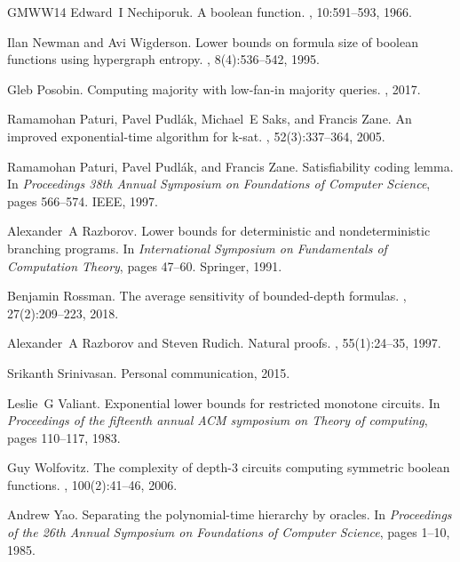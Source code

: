 \documentclass[10pt,a4paper]{article}
\theoremstyle{definition}
\theoremstyle{remark}
\begin{document}
\begin{thebibliography}{GMWW14}
Edward~I Nechiporuk.
\newblock A boolean function.
, 10:591--593, 1966.

Ilan Newman and Avi Wigderson.
\newblock Lower bounds on formula size of boolean functions using hypergraph
  entropy.
, 8(4):536--542, 1995.

Gleb Posobin.
\newblock Computing majority with low-fan-in majority queries.
, 2017.

Ramamohan Paturi, Pavel Pudl{\'a}k, Michael~E Saks, and Francis Zane.
\newblock An improved exponential-time algorithm for k-sat.
, 52(3):337--364, 2005.

Ramamohan Paturi, Pavel Pudl{\'a}k, and Francis Zane.
\newblock Satisfiability coding lemma.
\newblock In {\em Proceedings 38th Annual Symposium on Foundations of Computer
  Science}, pages 566--574. IEEE, 1997.

Alexander~A Razborov.
\newblock Lower bounds for deterministic and nondeterministic branching
  programs.
\newblock In {\em International Symposium on Fundamentals of Computation
  Theory}, pages 47--60. Springer, 1991.

Benjamin Rossman.
\newblock The average sensitivity of bounded-depth formulas.
, 27(2):209--223, 2018.

Alexander~A Razborov and Steven Rudich.
\newblock Natural proofs.
, 55(1):24--35, 1997.

Srikanth Srinivasan.
\newblock Personal communication, 2015.

Leslie~G Valiant.
\newblock Exponential lower bounds for restricted monotone circuits.
\newblock In {\em Proceedings of the fifteenth annual ACM symposium on Theory
  of computing}, pages 110--117, 1983.

Guy Wolfovitz.
\newblock The complexity of depth-3 circuits computing symmetric boolean
  functions.
, 100(2):41--46, 2006.

Andrew Yao.
\newblock Separating the polynomial-time hierarchy by oracles.
\newblock In {\em Proceedings of the 26th Annual Symposium on Foundations of
  Computer Science}, pages 1--10, 1985.

\end{thebibliography}
\end{document}
